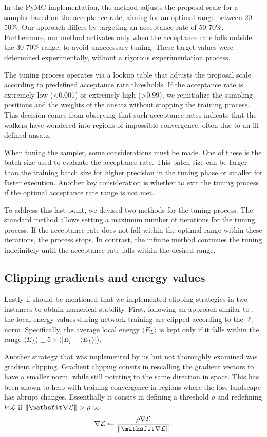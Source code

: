 In the PyMC implementation, the method adjusts the proposal scale for a sampler based on the acceptance rate, aiming for an optimal range between 20-50\%. Our approach differs by targeting an acceptance rate of 50-70\%. Furthermore, our method activates only when the acceptance rate falls outside the 30-70\% range, to avoid unnecessary tuning. These target values were determined experimentally, without a rigorous experimentation process.

The tuning process operates via a lookup table that adjusts the proposal scale according to predefined acceptance rate thresholds. If the acceptance rate is extremely low (<0.001) or extremely high (>0.99), we reinitialize the sampling positions and the weights of the ansatz without stopping the training process. This decision comes from observing that such acceptance rates indicate that the walkers have wondered into regions of impossible convergence, often due to an ill-defined ansatz.

When tuning the sampler, some considerations must be made. One of these is the batch size used to evaluate the acceptance rate. This batch size can be larger than the training batch size for higher precision in the tuning phase or smaller for faster execution. Another key consideration is whether to exit the tuning process if the optimal acceptance rate range is not met.

To address this last point, we devised two methods for the tuning process. The standard method allows setting a maximum number of iterations for the tuning process. If the acceptance rate does not fall within the optimal range within these iterations, the process stops. In contrast, the infinite method continues the tuning indefinitely until the acceptance rate falls within the desired range.

\subsection{Clipping gradients and energy values}
Lastly if should be mentioned that we implemented clipping strategies in two instances to obtain numerical stability. First, following an approach similar to \cite{ferminet}, the local energy values during network training are clipped according to the $\ell_1$ norm. Specifically, the average local energy $\langle E_L\rangle $ is kept only if it falls within the range $\langle E_L\rangle \pm 5 \times \langle | E_i - \langle E_L\rangle |\rangle$.

Another strategy that was implemented by us but not thoroughly examined was gradient clipping. Gradient clipping consits in rescalling the gradient vectors to have a smaller norm, while still pointing to the same direction in space. This has been shown to help with training convergence in regions where the loss landscape has abrupt changes. Essentlially it consits in defining a threshold $\rho$ and redefining $ \nabla \mathcal{L}$ if $\norm{\nabla \mathcal{L}} > \rho $ to 
\begin{equation}
    \nabla \mathcal{L} \leftarrow \frac{\rho \nabla \mathcal{L} }{\norm{\nabla \mathcal{L}}}.
\end{equation}



